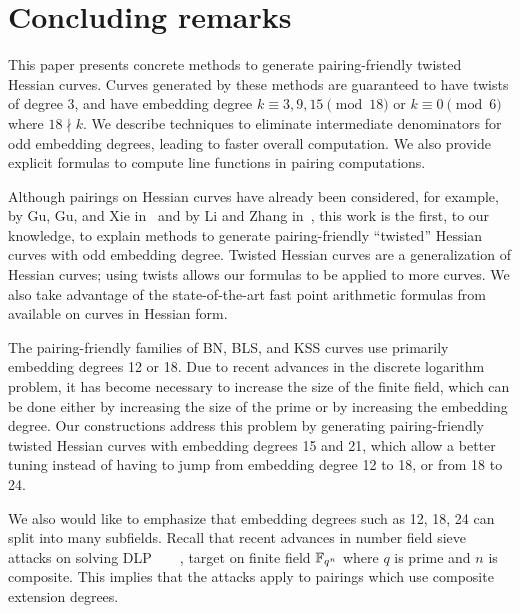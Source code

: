 \section{Concluding remarks}
\label{sec:conclude}


This paper presents concrete methods to generate pairing-friendly twisted Hessian curves.
Curves generated by these methods are guaranteed to have twists of degree $3$, and
have embedding degree
$k \equiv 3,9,15 \pmod{18}$ or
$k \equiv 0 \pmod{6}$ where $18 \nmid k$.
We describe techniques to eliminate intermediate denominators for odd embedding degrees, leading to faster overall computation.
We also provide explicit formulas to compute line functions in pairing computations.

Although pairings on Hessian curves have already been considered,
for example, by Gu, Gu, and Xie in~\cite{2010/Gu} and by Li and Zhang in~\cite{2012/Li},
this work is the first, to our knowledge,
to explain methods to generate pairing-friendly ``twisted'' Hessian curves with odd embedding degree.
Twisted Hessian curves are a generalization of Hessian curves; using twists allows our formulas to be applied to more curves.
We also take advantage of the state-of-the-art fast point arithmetic formulas from~\cite{2015/hessian} available on curves in Hessian form.

The pairing-friendly families of BN, BLS, and KSS curves use primarily embedding degrees 12 or 18.
Due to recent advances in the discrete logarithm problem, it has become necessary to increase the size of the finite field,
which can be done either by increasing the size of the prime or by increasing the embedding degree.
Our constructions address this problem by generating pairing-friendly twisted Hessian curves with embedding degrees 15 and 21,
which allow a better tuning instead of having to jump from embedding degree 12 to 18, or from 18 to 24.

We also would like to emphasize that embedding degrees such as 12, 18, 24 can split into many subfields.
Recall that recent advances in number field sieve attacks on solving DLP~\cite{2016/conjugate}~\cite{2016/SS}~\cite{2016/KB}~\cite{2017/KJ},
target on finite field $\mathbb{F}_{q^n}$ where $q$ is prime and $n$ is composite.
This implies that the attacks apply to pairings which use composite extension degrees.


